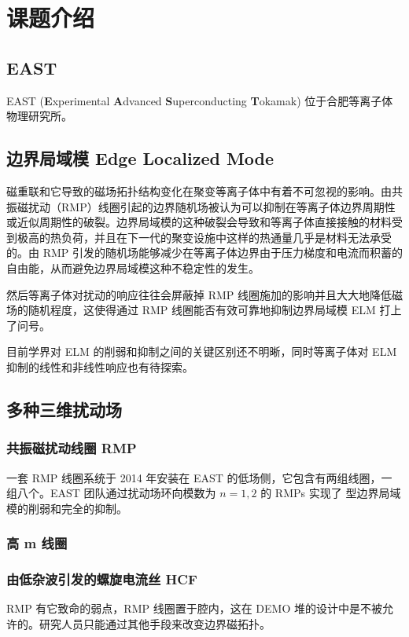\chapter{课题介绍}

\section{EAST}
EAST (\textbf{E}xperimental \textbf{A}dvanced \textbf{S}uperconducting \textbf{T}okamak) 位于合肥等离子体物理研究所。

\section{边界局域模 Edge Localized Mode}
磁重联和它导致的磁场拓扑结构变化在聚变等离子体中有着不可忽视的影响。由共振磁扰动（RMP）线圈引起的边界随机场被认为可以抑制在等离子体边界周期性或近似周期性的破裂。边界局域模的这种破裂会导致和等离子体直接接触的材料受到极高的热负荷，并且在下一代的聚变设施中这样的热通量几乎是材料无法承受的。由 RMP 引发的随机场能够减少在等离子体边界由于压力梯度和电流而积蓄的自由能，从而避免边界局域模这种不稳定性的发生。

然后等离子体对扰动的响应往往会屏蔽掉 RMP 线圈施加的影响并且大大地降低磁场的随机程度，这使得通过 RMP 线圈能否有效可靠地抑制边界局域模 ELM 打上了问号。


目前学界对 ELM 的削弱和抑制之间的关键区别还不明晰，同时等离子体对 ELM 抑制的线性和非线性响应也有待探索。

\section{多种三维扰动场}
\subsection{共振磁扰动线圈 RMP}

一套 RMP 线圈系统于 2014 年安装在 EAST 的低场侧，它包含有两组线圈，一组八个。EAST 团队通过扰动场环向模数为 $n=1, 2$ 的 RMPs 实现了  型边界局域模的削弱和完全的抑制。
\subsection{高 m 线圈}

\subsection{由低杂波引发的螺旋电流丝 HCF}
RMP 有它致命的弱点，RMP 线圈置于腔内，这在 DEMO 堆的设计中是不被允许的。研究人员只能通过其他手段来改变边界磁拓扑。 

